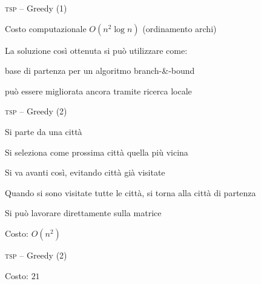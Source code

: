 \begin{frame}{\textsc{tsp} -- Greedy (1)}

\BIL
\item Costo computazionale $O(n^2 \log n)$ (ordinamento archi)
\item La soluzione così ottenuta si può utilizzare come:
\BI
\item base di partenza per un algoritmo branch-\&-bound
\item può essere migliorata ancora tramite ricerca locale
\EI
\EIL

\end{frame}

\begin{frame}{\textsc{tsp} -- Greedy (2)}

\BIL
\item Si parte da una città
\item Si seleziona come prossima città quella più vicina
\item Si va avanti così, evitando città già visitate
\item Quando si sono visitate tutte le città, si torna alla città di
partenza
\item Si può lavorare direttamente sulla matrice
\item Costo: $O(n^2)$
\EIL

\end{frame}

\begin{frame}{\textsc{tsp} -- Greedy (2)}


\alert{
\bigskip
{}Costo: $21$
}


\end{frame}


